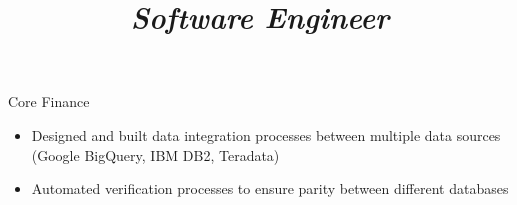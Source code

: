 \documentclass[margin,11pt]{res}
\begin{document}
\begin{resume}
\vspace{\baselineskip}

\title{\sl{Software Engineer}}
\begin{position}
Core Finance\\
\begin{itemize}
\item Designed and built data integration processes between multiple data sources (Google BigQuery, IBM DB2, Teradata)
\item Automated verification processes to ensure parity between different databases
\end{itemize}
\end{position}

\end{resume}
\end{document}
